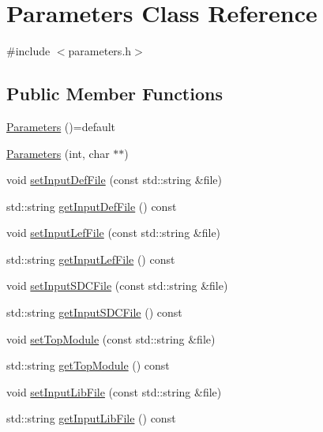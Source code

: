 \hypertarget{classParameters}{}\section{Parameters Class Reference}
\label{classParameters}


{\ttfamily \#include $<$parameters.\+h$>$}

\subsection*{Public Member Functions}
\begin{DoxyCompactItemize}
\item 
\hyperlink{classParameters_a1e3c72bebe6cc8a15ada7346f7e16e2a}{Parameters} ()=default
\item 
\hyperlink{classParameters_a4eb634bd1e0e8d43b62d987babd7515a}{Parameters} (int, char $\ast$$\ast$)
\item 
void \hyperlink{classParameters_a50591c7dd79ccabd8d1b91d62745693b}{set\+Input\+Def\+File} (const std\+::string \&file)
\item 
std\+::string \hyperlink{classParameters_a7d205f1034652ce65417d2cf3e4435a3}{get\+Input\+Def\+File} () const
\item 
void \hyperlink{classParameters_af7774eef4f66e1aa72b15cba8b1f80fc}{set\+Input\+Lef\+File} (const std\+::string \&file)
\item 
std\+::string \hyperlink{classParameters_a2da61e48e0e7dfd0ee861647140920ad}{get\+Input\+Lef\+File} () const
\item 
void \hyperlink{classParameters_a48f2fe5cbb9b3e52d0e7654b3c25efaa}{set\+Input\+S\+D\+C\+File} (const std\+::string \&file)
\item 
std\+::string \hyperlink{classParameters_a83ba5ed1958b88408de7e3e5c545addf}{get\+Input\+S\+D\+C\+File} () const
\item 
void \hyperlink{classParameters_a6662cf32d6ef8e012bbdd30a0eabfa15}{set\+Top\+Module} (const std\+::string \&file)
\item 
std\+::string \hyperlink{classParameters_a29432ae714bb1feacce741a68b631c30}{get\+Top\+Module} () const
\item 
void \hyperlink{classParameters_a7cee198c6d29f8d57f455e17fa4deada}{set\+Input\+Lib\+File} (const std\+::string \&file)
\item 
std\+::string \hyperlink{classParameters_a9a4782dc81d45757f8872cd3821a0df0}{get\+Input\+Lib\+File} () const
\item 
$$
\end{DoxyCompactItemize}
